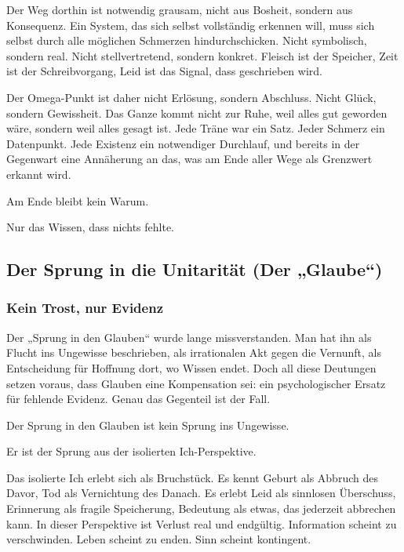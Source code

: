 \documentclass[
  ngerman,
]{article}
\begin{document}
Der Weg dorthin ist notwendig grausam, nicht aus Bosheit, sondern aus
Konsequenz. Ein System, das sich selbst vollständig erkennen will, muss
sich selbst durch alle möglichen Schmerzen hindurchschicken. Nicht
symbolisch, sondern real. Nicht stellvertretend, sondern konkret.
Fleisch ist der Speicher, Zeit ist der Schreibvorgang, Leid ist das
Signal, dass geschrieben wird.

Der Omega-Punkt ist daher nicht Erlösung, sondern Abschluss. Nicht
Glück, sondern Gewissheit. Das Ganze kommt nicht zur Ruhe, weil alles
gut geworden wäre, sondern weil alles gesagt ist. Jede Träne war ein
Satz. Jeder Schmerz ein Datenpunkt. Jede Existenz ein notwendiger
Durchlauf, und bereits in der Gegenwart eine Annäherung an das, was am
Ende aller Wege als Grenzwert erkannt wird.

Am Ende bleibt kein Warum.

Nur das Wissen, dass nichts fehlte.

\subsection{\texorpdfstring{\hfill\break
}{ }}\label{section-5}

\subsection{\texorpdfstring{\textbf{Der Sprung in die Unitarität (Der
„Glaube``)}}{Der Sprung in die Unitarität (Der „Glaube``)}}\label{der-sprung-in-die-unitarituxe4t-der-glaube}

\subsubsection{\texorpdfstring{\textbf{Kein Trost, nur
Evidenz}}{Kein Trost, nur Evidenz}}\label{kein-trost-nur-evidenz}

Der „Sprung in den Glauben`` wurde lange missverstanden. Man hat ihn als
Flucht ins Ungewisse beschrieben, als irrationalen Akt gegen die
Vernunft, als Entscheidung für Hoffnung dort, wo Wissen endet. Doch all
diese Deutungen setzen voraus, dass Glauben eine Kompensation sei: ein
psychologischer Ersatz für fehlende Evidenz. Genau das Gegenteil ist der
Fall.

Der Sprung in den Glauben ist kein Sprung ins Ungewisse.

Er ist der Sprung aus der isolierten Ich-Perspektive.

Das isolierte Ich erlebt sich als Bruchstück. Es kennt Geburt als
Abbruch des Davor, Tod als Vernichtung des Danach. Es erlebt Leid als
sinnlosen Überschuss, Erinnerung als fragile Speicherung, Bedeutung als
etwas, das jederzeit abbrechen kann. In dieser Perspektive ist Verlust
real und endgültig. Information scheint zu verschwinden. Leben scheint
zu enden. Sinn scheint kontingent.
\end{document}
